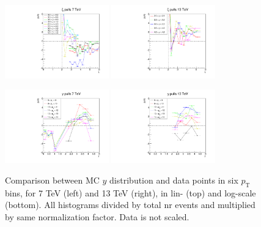 \documentclass{article}
\newcommand{\pt}{p_\text{T}}
\begin{document}
\begin{figure}[h!]
\centering
\includegraphics[width = 0.4\textwidth]{plots/xi_pulls_7.pdf}
\includegraphics[width = 0.4\textwidth]{plots/xi_pulls_13.pdf}

\includegraphics[width = 0.4\textwidth]{plots/y_pulls_7.pdf}
\includegraphics[width = 0.4\textwidth]{plots/y_pulls_13.pdf}
\caption{Comparison between MC $y$ distribution and data points in six  $\pt$ bins, for 7 TeV (left) and 13 TeV (right), in lin- (top) and log-scale (bottom). All histograms divided by total nr events and multiplied by same normalization factor. Data is not scaled.}\label{f:pull_comp}
\end{figure}
\end{document}
